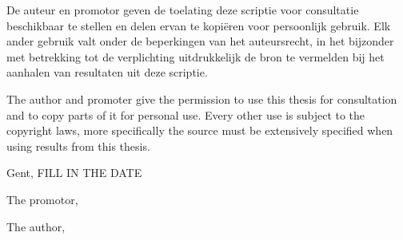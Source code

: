 

\par\vspace*{\fill}

De auteur en promotor geven de toelating deze scriptie voor consultatie beschikbaar te stellen en delen ervan te kopi\"eren voor persoonlijk gebruik. Elk ander gebruik valt onder de beperkingen van het auteursrecht, in het bijzonder met betrekking tot de verplichting uitdrukkelijk de bron te vermelden bij het aanhalen van resultaten uit deze scriptie.

The author and promoter give the permission to use this thesis for consultation and to copy parts of it for personal use. Every other use is subject to the copyright laws, more specifically the source must be extensively specified when using results from this thesis.

\vspace{1cm}

Gent, FILL IN THE DATE %

\vspace{1cm}

\begin{minipage}[t][4cm][t]{0.5\textwidth}
\raggedright
The promotor,

\vspace{2.5cm}

\insertpromotor %
\end{minipage}
\begin{minipage}[t][4cm][t]{0.48\textwidth}
\raggedright
The author,

\vspace{2.5cm}

\insertauthor %
\end{minipage}

\thispagestyle{empty} 

